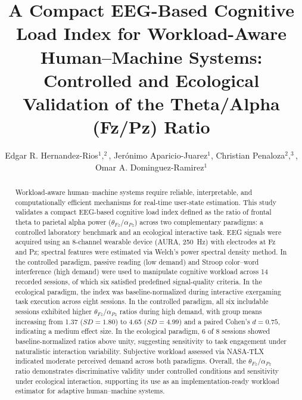 \documentclass[10pt]{iopart}
\begin{document}
\title[A Compact EEG-Based Cognitive Load Index for HMI]
{A Compact EEG-Based Cognitive Load Index for Workload-Aware Human--Machine Systems: Controlled and Ecological Validation of the Theta/Alpha (Fz/Pz) Ratio}

\author{Edgar R. Hernandez-Rios$^1$$,^2$, 
Jerónimo Aparicio-Juarez$^1$, 
Christian Penaloza$^2$$,^3$,
Omar A. Dominguez-Ramirez$^1$}

\address{$^1$ Universidad Autonoma del Estado de Hidalgo (UAEH), Pachuca, Mexico}
\address{$^2$ Mirai Innovation Research Institute, Osaka, Japan}
\address{$^3$ Universidad Autonoma de Chihuahua (UACH), Chihuahua, Mexico}


\begin{abstract}
Workload-aware human--machine systems require reliable,
interpretable, and computationally efficient mechanisms for
real-time user-state estimation. This study validates a compact
EEG-based cognitive load index defined as the ratio of frontal
theta to parietal alpha power ($\theta_{Fz}/\alpha_{Pz}$) across
two complementary paradigms: a controlled laboratory benchmark
and an ecological interactive task. EEG signals were acquired
using an 8-channel wearable device (AURA, 250~Hz) with electrodes
at Fz and Pz; spectral features were estimated via Welch's power
spectral density method. In the controlled paradigm, passive
reading (low demand) and Stroop color--word interference (high
demand) were used to manipulate cognitive workload across 14
recorded sessions, of which six satisfied predefined
signal-quality criteria. In the ecological paradigm, the index
was baseline-normalized during interactive exergaming task
execution across eight sessions. In the controlled paradigm, all
six includable sessions exhibited higher $\theta_{Fz}/\alpha_{Pz}$
ratios during high demand, with group means increasing from 1.37
($SD = 1.80$) to 4.65 ($SD = 4.99$) and a paired Cohen's
$d = 0.75$, indicating a medium effect size. In the ecological
paradigm, 6 of 8 sessions showed baseline-normalized ratios above
unity, suggesting sensitivity to task engagement under naturalistic
interaction variability. Subjective workload assessed via NASA-TLX
indicated moderate perceived demand across both paradigms. Overall,
the $\theta_{Fz}/\alpha_{Pz}$ ratio demonstrates discriminative
validity under controlled conditions and sensitivity under
ecological interaction, supporting its use as an
implementation-ready workload estimator for adaptive human--machine
systems.
\end{abstract}
\end{document}
